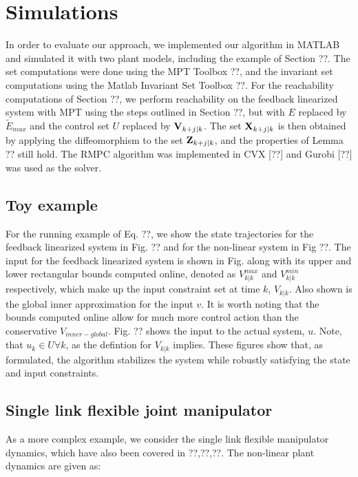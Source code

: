 \section{Simulations}
\label{sec:simulations}

In order to evaluate our approach, we implemented our algorithm in MATLAB and simulated it with two plant models, including the example of Section ??. The set computations were done using the MPT Toolbox ??, and the invariant set computations using the Matlab Invariant Set Toolbox ??. For the reachability computations of Section ??, we perform reachability on the feedback linearized system with MPT using the steps outlined in Section ??, but with $E$ replaced by $\tilde{E}_{max}$ and the control set $U$ replaced by $\mathbf{V}_{k+j|k}$. The set $\mathbf{X}_{k+j|k}$ is then obtained by applying the diffeomorphism to the set $\mathbf{Z}_{k+j|k}$, and the properties of Lemma ?? still hold. The RMPC algorithm was implemented in CVX [??] and Gurobi [??] was used as the solver.

\subsection{Toy example}

For the running example of Eq. ??, we show the state trajectories for the feedback linearized system in Fig. ?? and for the non-linear system in Fig ??. The input for the feedback linearized system is shown in Fig. along with its upper and lower rectangular bounds computed online, denoted as $ V^{max}_{k|k}$ and $ V^{min}_{k|k}$ respectively, which make up the input constraint set at time $k$, $V_{k|k}$. Also shown is the global inner approximation for the input $v$. It is worth noting that the bounds computed online allow for much more control action than the conservative $V_{inner-global}$. Fig. ?? shows the input to the actual system, $u$. Note, that $u_k \in U \forall k$, as the defintion for $V_{k|k}$ implies. These figures show that, as formulated, the algorithm stabilizes the system while robustly satisfying the state and input constraints.

\subsection{Single link flexible joint manipulator}

As a more complex example, we consider the single link flexible manipulator dynamics, which have also been covered in ??,??,??. The non-linear plant dynamics are given as:


